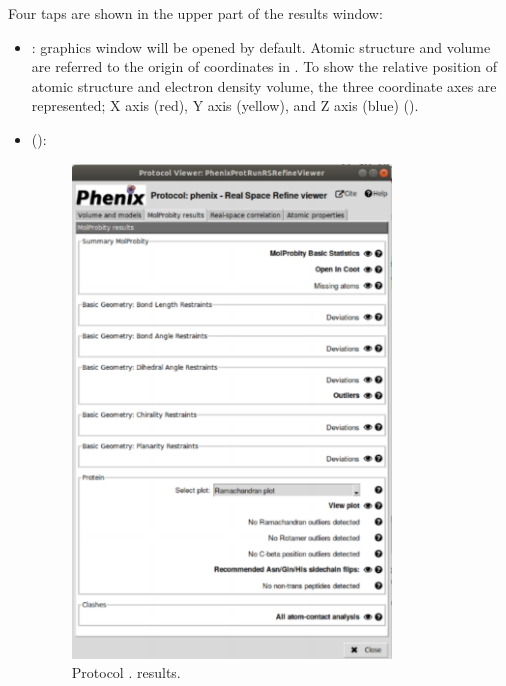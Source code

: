 \begin{itemize}
Four taps are shown in the upper part of the results window:
   \begin{itemize}
     \item {}: \chimera graphics window will be opened by default. Atomic structure and volume are referred to the origin of coordinates in \chimera. To show the relative position of atomic structure and electron density volume, the three coordinate axes are represented; X axis (red), Y axis (yellow), and Z axis (blue) ().\\
     \item {} ():
        \begin{figure}[H]
         \centering 
         \captionsetup{width=.7\linewidth} 
         \includegraphics[width=0.80\textwidth]{Images_appendix/Fig150.pdf}
         \caption{Protocol . \phenix {} results.}
         \label{fig:app_protocol_real_space_refine_3}
        \end{figure}
        

\end{itemize}
\end{itemize}
